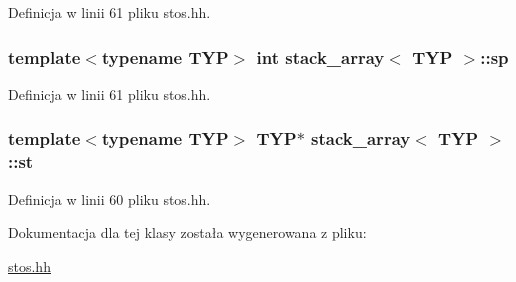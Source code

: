 Definicja w linii 61 pliku stos.\-hh.

\hypertarget{classstack__array_a598f4974aca293a20a809788ffe80b15}{
\subsubsection[{sp}]{\setlength{\rightskip}{0pt plus 5cm}template$<$typename T\-Y\-P$>$ int {\bf stack\-\_\-array}$<$ T\-Y\-P $>$\-::sp\hspace{0.3cm}{\ttfamily [private]}}}\label{classstack__array_a598f4974aca293a20a809788ffe80b15}


Definicja w linii 61 pliku stos.\-hh.

\hypertarget{classstack__array_aa97b399041c2d08b3955bb6436cbcf2f}{
\subsubsection[{st}]{\setlength{\rightskip}{0pt plus 5cm}template$<$typename T\-Y\-P$>$ T\-Y\-P$\ast$ {\bf stack\-\_\-array}$<$ T\-Y\-P $>$\-::st\hspace{0.3cm}{\ttfamily [private]}}}\label{classstack__array_aa97b399041c2d08b3955bb6436cbcf2f}


Definicja w linii 60 pliku stos.\-hh.



Dokumentacja dla tej klasy została wygenerowana z pliku\-:\begin{DoxyCompactItemize}
\item 
\hyperlink{stos_8hh}{stos.\-hh}\end{DoxyCompactItemize}
